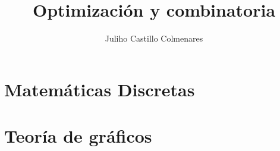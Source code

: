\documentclass[
]{WileySix}
\title{Optimización y combinatoria}
\author[J. Castillo]{Juliho Castillo Colmenares}
\begin{document}
	\maketitle
	\tableofcontents

\chapter{Matemáticas Discretas}





\chapter{Teoría de gráficos}




{}

\end{document}
